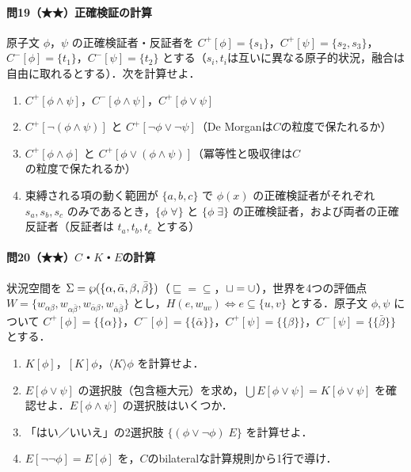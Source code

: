 \documentclass[../../main-detail.tex]{subfiles}
\begin{document}
\paragraph{問19（★★）正確検証の計算}
原子文 $\phi$，$\psi$ の正確検証者・反証者を $C^+[\phi] = \{s_1\}$，$C^+[\psi] = \{s_2, s_3\}$，$C^-[\phi] = \{t_1\}$，$C^-[\psi] = \{t_2\}$ とする（$s_i, t_i$は互いに異なる原子的状況，融合は自由に取れるとする）．次を計算せよ．
\begin{enumerate}[label=(\alph*)]
    \item $C^+[\phi \land \psi]$，$C^-[\phi \land \psi]$，$C^+[\phi \lor \psi]$
    \item $C^+[\lnot(\phi \land \psi)]$ と $C^+[\lnot\phi \lor \lnot\psi]$（De Morganは$C$の粒度で保たれるか）
    \item $C^+[\phi \land \phi]$ と $C^+[\phi \lor (\phi \land \psi)]$（冪等性と吸収律は$C$の粒度で保たれるか）
    \item 束縛される項の動く範囲が $\{a, b, c\}$ で $\phi(x)$ の正確検証者がそれぞれ $s_a, s_b, s_c$ のみであるとき，$\{\phi\;\forall\}$ と $\{\phi\;\exists\}$ の正確検証者，および両者の正確反証者（反証者は $t_a, t_b, t_c$ とする）
\end{enumerate}

\paragraph{問20（★★）$C$・$K$・$E$の計算}
状況空間を $\Sigma = \wp(\{\alpha, \bar\alpha, \beta, \bar\beta\})$（$\sqsubseteq = \subseteq$，$\sqcup = \cup$），世界を4つの評価点 $W = \{w_{\alpha\beta}, w_{\alpha\bar\beta}, w_{\bar\alpha\beta}, w_{\bar\alpha\bar\beta}\}$ とし，$H(e,w_{uv})\iff e\subseteq\{u,v\}$ とする．原子文 $\phi, \psi$ について $C^+[\phi] = \{\{\alpha\}\}$，$C^-[\phi] = \{\{\bar\alpha\}\}$，$C^+[\psi] = \{\{\beta\}\}$，$C^-[\psi] = \{\{\bar\beta\}\}$ とする．
\begin{enumerate}[label=(\alph*)]
    \item $K[\phi]$，$[K]\phi$，$\langle K\rangle\phi$ を計算せよ．
    \item $E[\phi \lor \psi]$ の選択肢（包含極大元）を求め，$\bigcup E[\phi\lor\psi] = K[\phi\lor\psi]$ を確認せよ．$E[\phi \land \psi]$ の選択肢はいくつか．
    \item 「はい／いいえ」の2選択肢 $\{(\phi \lor \lnot\phi)\; E\}$ を計算せよ．
    \item $E[\lnot\lnot\phi] = E[\phi]$ を，$C$のbilateralな計算規則から1行で導け．
\end{enumerate}
\end{document}
